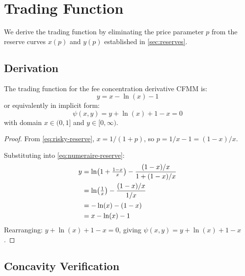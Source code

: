 
\section{Trading Function}\label{sec:trading-function}

We derive the trading function by eliminating the price parameter $p$ from the
reserve curves $x(p)$ and $y(p)$ established in \cref{sec:reserves}.

\subsection{Derivation}

\begin{theorem}\label{thm:trading-function}
The trading function for the fee concentration derivative CFMM is:
\begin{equation}\label{eq:trading-function-explicit}
  y = x - \ln(x) - 1
\end{equation}
or equivalently in implicit form:
\begin{equation}\label{eq:trading-function-implicit}
  \psi(x, y) = y + \ln(x) + 1 - x = 0
\end{equation}
with domain $x \in (0, 1]$ and $y \in [0, \infty)$.
\end{theorem}

\begin{proof}
From \eqref{eq:risky-reserve}, $x = 1/(1+p)$, so $p = 1/x - 1 = (1-x)/x$.

Substituting into \eqref{eq:numeraire-reserve}:
\begin{align}
  y &= \ln\bigl(1 + \tfrac{1-x}{x}\bigr) - \frac{(1-x)/x}{1 + (1-x)/x} \notag\\
    &= \ln\bigl(\tfrac{1}{x}\bigr) - \frac{(1-x)/x}{1/x} \notag\\
    &= -\ln(x) - (1-x) \notag\\
    &= x - \ln(x) - 1 \label{eq:y-from-x}
\end{align}
Rearranging: $y + \ln(x) + 1 - x = 0$, giving $\psi(x,y) = y + \ln(x) + 1 - x$. \qedhere
\end{proof}

\subsection{Concavity Verification}


